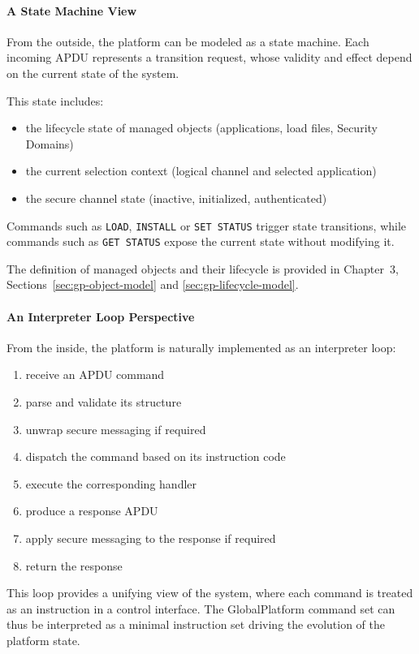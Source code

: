 \paragraph{A State Machine View}

From the outside, the platform can be modeled as a state machine. Each incoming
APDU represents a transition request, whose validity and effect depend on the
current state of the system.

This state includes:
\begin{itemize}
\item the lifecycle state of managed objects (applications, load files,
    Security Domains)
\item the current selection context (logical channel and selected application)
\item the secure channel state (inactive, initialized, authenticated)
\end{itemize}

Commands such as \texttt{LOAD}, \texttt{INSTALL} or \texttt{SET STATUS} trigger
state transitions, while commands such as \texttt{GET STATUS} expose the
current state without modifying it.

The definition of managed objects and their lifecycle is provided in
Chapter~3, Sections~\ref{sec:gp-object-model} and \ref{sec:gp-lifecycle-model}.

\paragraph{An Interpreter Loop Perspective}

From the inside, the platform is naturally implemented as an interpreter loop:

\begin{enumerate}
\item receive an APDU command
\item parse and validate its structure
\item unwrap secure messaging if required
\item dispatch the command based on its instruction code
\item execute the corresponding handler
\item produce a response APDU
\item apply secure messaging to the response if required
\item return the response
\end{enumerate}

This loop provides a unifying view of the system, where each command is treated
as an instruction in a control interface. The GlobalPlatform command set can
thus be interpreted as a minimal instruction set driving the evolution of the
platform state.

